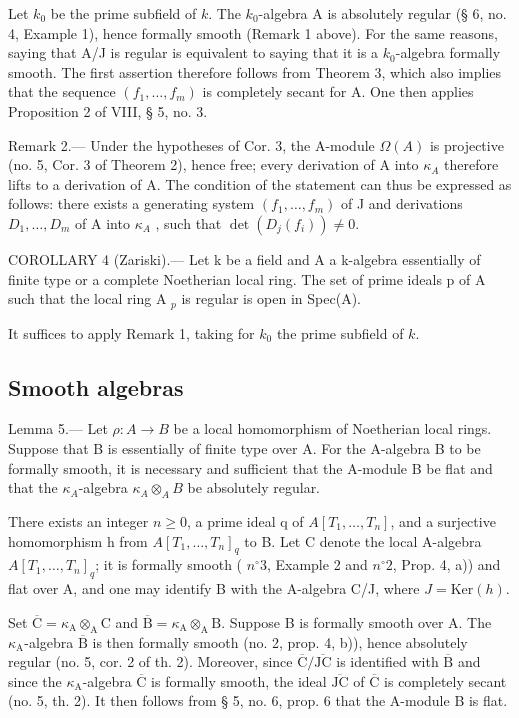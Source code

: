 Let \(k_0\) be the prime subfield of \(k\). The \(k_0\)-algebra A is absolutely regular (§ 6, no. 4, Example 1), hence formally smooth (Remark 1 above). For the same reasons, saying that A/J is regular is equivalent to saying that it is a \(k_0\)-algebra formally smooth. The first assertion therefore follows from Theorem 3, which also implies that the sequence \((f_1,\ldots,f_m)\) is completely secant for A. One then applies Proposition 2 of VIII, § 5, no. 3.

Remark 2.--- Under the hypotheses of Cor. 3, the A-module \(\Omega(A)\) is projective (no. 5, Cor. 3 of Theorem 2), hence free; every derivation of A into \(\kappa_{A}\) therefore lifts to a derivation of A. The condition of the statement can thus be expressed as follows: there exists a generating system \((f_{1},\ldots,f_{m})\) of J and derivations \(D_{1},\ldots,D_{m}\) of A into \(\kappa_{A}\) , such that \(\det(D_{j}(f_{i}))\neq0\).

COROLLARY 4 (Zariski).--- Let k be a field and A a k-algebra essentially of finite type or a complete Noetherian local ring. The set of prime ideals p of A such that the local ring A \(_{p}\) is regular is open in Spec(A).

It suffices to apply Remark 1, taking for \(k_0\) the prime subfield of \(k\).

\subsection{Smooth algebras}

Lemma 5.--- Let \(\rho: A \to B\) be a local homomorphism of Noetherian local rings. Suppose that B is essentially of finite type over A. For the A-algebra B to be formally smooth, it is necessary and sufficient that the A-module B be flat and that the \(\kappa_{A}\)-algebra \(\kappa_{A} \otimes_{A} B\) be absolutely regular.

There exists an integer \(n \geqslant 0\), a prime ideal q of \(A[T_{1}, \ldots, T_{n}]\), and a surjective homomorphism h from \(A[T_{1}, \ldots, T_{n}]_{q}\) to B. Let C denote the local A-algebra \(A[T_{1}, \ldots, T_{n}]_{q}\); it is formally smooth ( \(n^{\circ} 3\), Example 2 and \(n^{\circ} 2\), Prop. 4, a)) and flat over A, and one may identify B with the A-algebra C/J, where \(J = \text{Ker}(h)\).

Set \(\overline{\mathrm{C}} = \kappa_{\mathrm{A}} \otimes_{\mathrm{A}} \mathrm{C}\) and \(\overline{\mathrm{B}} = \kappa_{\mathrm{A}} \otimes_{\mathrm{A}} \mathrm{B}\). Suppose B is formally smooth over A. The \(\kappa_{\mathrm{A}}\)-algebra \(\overline{\mathrm{B}}\) is then formally smooth (no. 2, prop. 4, b)), hence absolutely regular (no. 5, cor. 2 of th. 2). Moreover, since \(\overline{\mathrm{C}} / \overline{\mathrm{JC}}\) is identified with \(\overline{\mathrm{B}}\) and since the \(\kappa_{\mathrm{A}}\)-algebra \(\overline{\mathrm{C}}\) is formally smooth, the ideal \(\overline{\mathrm{JC}}\) of \(\overline{\mathrm{C}}\) is completely secant (no. 5, th. 2). It then follows from § 5, no. 6, prop. 6 that the A-module B is flat.

